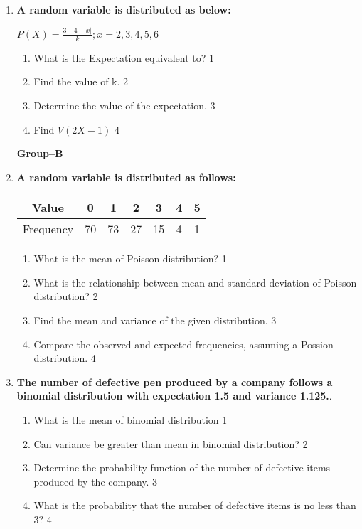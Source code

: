 \documentclass{article}
\begin{document}
\begin{enumerate}
        \item \textbf{A random variable is distributed as below:}
        
        \begin{center}
  \textbf{$P(X) = \frac{3-\vert 4-x\vert}{k}; x=2,3,4,5,6$}
  \end{center}

  \begin{enumerate}
    \item
	What is the Expectation equivalent to? \hfill 1
    \item
    	Find the value of k. \hfill 2
    \item
    	Determine the value of the expectation. \hfill 3
     \item
     	Find $V(2X-1)$ \hfill 4
  \end{enumerate}
  
    \begin{center}
  \textbf{Group--B}
  \end{center}
  
   \item
	  \textbf{A random variable is distributed as follows:} 
	  
	  \begin{table}[h]
	  \centering
\begin{tabular}{ccccccc}
Value & 0 & 1 & 2 & 3 & 4 & 5 \\ \hline
Frequency & 70 & 73 & 27 & 15 & 4 & 1
\end{tabular}
\end{table}

  \begin{enumerate}
    \item
	What is the mean of Poisson distribution? \hfill 1
    \item
	What is the relationship between mean and standard deviation of Poisson distribution? \hfill 2
    \item  
	Find the mean and variance of the given distribution. \hfill 3
    \item
	Compare the observed and expected frequencies, assuming a Possion distribution. \hfill 4
  \end{enumerate}
  
   \item
	  \textbf{The number of defective pen produced by a company follows a binomial distribution with expectation 1.5 and variance 1.125.}. 
  
  \begin{enumerate}
    \item
	What is the mean of binomial distribution \hfill 1
    \item
	Can variance be greater than mean in binomial distribution? \hfill 2
    \item  
	Determine the probability function of the number of defective items produced by the company. \hfill 3
    \item
	What is the probability that the number of defective items is no less than 3? \hfill 4
  \end{enumerate}
  

\end{enumerate}
\end{document}
